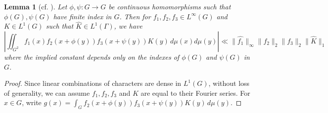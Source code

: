 \documentclass[10pt]{article}
\newtheorem{lemma}[lemma]{Lemma}
\theoremstyle{definition}
\begin{document}
\begin{lemma}[cf. {\cite[Lemma 2]{bourgain-roth}}]
\label{lem:bourgain_lemma_2}
 Let $\phi, \psi: G \rightarrow G$ be continuous homomorphisms such that $\phi(G), \psi(G)$ have finite index in $G$. Then for $f_1, f_2, f_3 \in L^\infty(G)$ and $K \in L^1(G)$ such that $\widehat{K} \in L^1(\Gamma)$, we have
\begin{equation} \label{eq:k}
\left| \iint_{G^2} f_1(x)f_2(x+ \phi(y))f_3(x+ \psi(y)) K(y) \, d\mu(x) d\mu(y) \right| \ll \| \widehat{f_1} \|_{\infty} \|f_2 \|_2 \| f_3\|_2 \| \widehat{K} \|_1  
\end{equation}
where the implied constant depends only on the indexes of $\phi(G)$ and $\psi(G)$ in $G$.
\end{lemma}

\begin{proof}
Since linear combinations of characters are dense in $L^1(G)$, without loss of generality, we can assume $f_1, f_2, f_3$ and $K$ are equal to their Fourier series. For $x \in G$, write $g(x) = \int_{G} f_2(x+ \phi(y) )f_3(x+ \psi(y) ) K(y) \, d\mu(y)$.


\end{proof}
\end{document}
